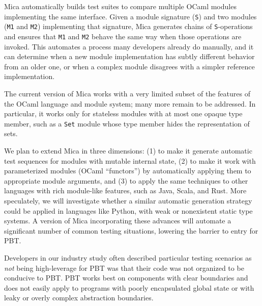 
Mica automatically builds test suites to compare multiple OCaml
modules implementing the same interface. Given a module signature
(\lstinline{S}) and two modules
(\lstinline{M1} and \lstinline{M2}) implementing that signature, Mica
generates chains of \lstinline{S}-operations and ensures that
\lstinline{M1} and \lstinline{M2} behave the same way when those operations are
invoked. This automates a process many developers already do manually,
and it can
determine when a new module implementation has subtly different
behavior from an older one, or when a
complex module disagrees with a simpler reference implementation.

The current version of Mica works with a very limited subset of
the features of the OCaml language and
module system; many more remain to be addressed. In particular, it
works only for stateless modules with at most one opaque type
member, such as a {\tt Set} module whose type member hides the
representation of sets.

We plan to extend Mica in three dimensions: (1) to make it generate automatic
test sequences for modules with mutable internal state, (2) to
make it work with parameterized modules (OCaml ``functors'') by
automatically applying them to appropriate module arguments, and (3)
to apply the same techniques to other languages with rich module-like
features, such as Java, Scala, and Rust.  More speculately, we will
investigate whether a similar automatic generation strategy could be
applied in languages like Python, with weak or nonexistent static type
systems.
%
A version of Mica incorporating these advances will automate a
significant number of common testing situations, lowering the barrier
to entry for PBT.


%
\iflater{}\fi
Developers in our industry study often described particular
testing scenarios as {\em not} being high-leverage for PBT was that
their code was not organized to be conducive to
PBT.  PBT works best on components with clear boundaries and does not
easily apply to programs with
poorly encapsulated global state or with leaky or overly complex abstraction
boundaries.

